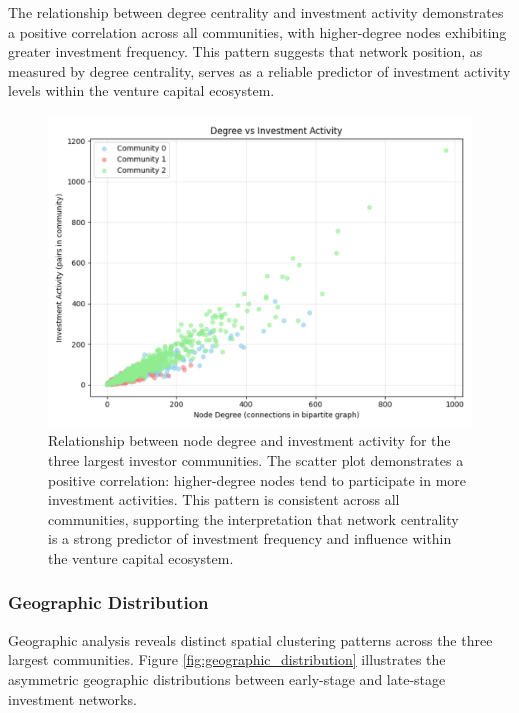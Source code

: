 The relationship between degree centrality and investment activity demonstrates a positive correlation across all communities, with higher-degree nodes exhibiting greater investment frequency. This pattern suggests that network position, as measured by degree centrality, serves as a reliable predictor of investment activity levels within the venture capital ecosystem.


\begin{figure}[htpb]
\centering
\includegraphics[width=1\textwidth]{./assets/degree_vs_investment.png}
\caption{Relationship between node degree and investment activity for the three largest investor communities. The scatter plot demonstrates a positive correlation: higher-degree nodes tend to participate in more investment activities. This pattern is consistent across all communities, supporting the interpretation that network centrality is a strong predictor of investment frequency and influence within the venture capital ecosystem.}
\label{fig:degree_vs_activity}
\end{figure}

\subsubsection{Geographic Distribution}

Geographic analysis reveals distinct spatial clustering patterns across the three largest communities. Figure \ref{fig:geographic_distribution} illustrates the asymmetric geographic distributions between early-stage and late-stage investment networks.

